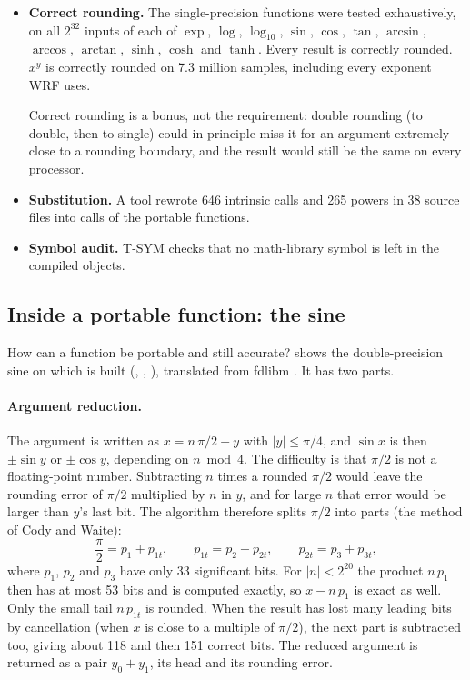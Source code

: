 \begin{portnote}
\begin{itemize}
  \item \textbf{Correct rounding.} The single-precision functions were tested exhaustively, on all $2^{32}$ inputs
    of each of $\exp$, $\log$, $\log_{10}$, $\sin$, $\cos$, $\tan$, $\arcsin$, $\arccos$, $\arctan$, $\sinh$, $\cosh$
    and $\tanh$. Every result is correctly rounded. $x^y$ is correctly rounded on 7.3 million samples, including
    every exponent WRF uses.

    Correct rounding is a bonus, not the requirement: double rounding (to double, then to single) could in principle
    miss it for an argument extremely close to a rounding boundary, and the result would still be the same on every
    processor.
  \item \textbf{Substitution.} A tool rewrote 646 intrinsic calls and 265 powers in 38 source files into calls of
    the portable functions.
  \item \textbf{Symbol audit.} T-SYM checks that no math-library symbol is left in the compiled objects.
\end{itemize}
\end{portnote}

\subsection{Inside a portable function: the sine}

How can a function be portable and still accurate?  shows the double-precision sine on which
 is built (, , ), translated from
fdlibm \citep{fdlibm}. It has two parts.

\paragraph{Argument reduction.} The argument is written as $x = n\,\pi/2 + y$ with $|y| \le \pi/4$, and
$\sin x$ is then $\pm\sin y$ or $\pm\cos y$, depending on $n \bmod 4$. The difficulty is that $\pi/2$ is not a
floating-point number. Subtracting $n$ times a rounded $\pi/2$ would leave the rounding error of $\pi/2$ multiplied
by $n$ in $y$, and for large $n$ that error would be larger than $y$'s last bit. The algorithm therefore splits
$\pi/2$ into parts (the method of Cody and Waite):
\begin{equation}
  \frac{\pi}{2} = p_1 + p_{1t}, \qquad p_{1t} = p_2 + p_{2t}, \qquad p_{2t} = p_3 + p_{3t},
\end{equation}
where $p_1$, $p_2$ and $p_3$ have only 33 significant bits. For $|n| < 2^{20}$ the product $n\,p_1$ then has at most
53 bits and is computed exactly, so $x - n\,p_1$ is exact as well. Only the small tail $n\,p_{1t}$ is rounded. When
the result has lost many leading bits by cancellation (when $x$ is close to a multiple of $\pi/2$), the next part is
subtracted too, giving about 118 and then 151 correct bits. The reduced argument is returned as a pair $y_0 + y_1$,
its head and its rounding error.

